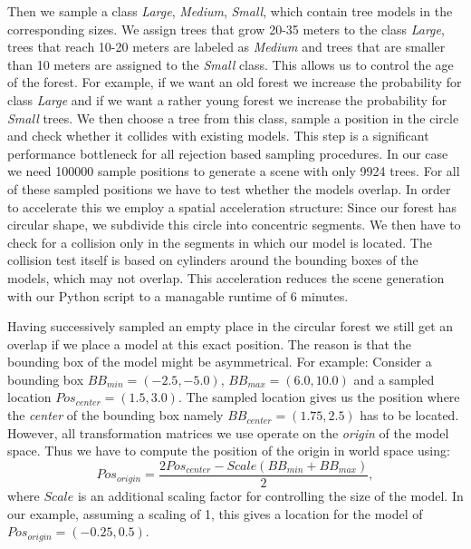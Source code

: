 Then we sample a class \textit{Large}, \textit{Medium}, \textit{Small}, which contain tree models in the corresponding sizes.
We assign trees that grow 20-35 meters to the class \textit{Large}, trees that reach 10-20 meters are labeled as \textit{Medium} and trees that are smaller than 10 meters are assigned to the \textit{Small} class.
This allows us to control the age of the forest.
For example, if we want an old forest we increase the probability for class \textit{Large} and if we want a rather young forest we increase the probability for \textit{Small} trees.
We then choose a tree from this class, sample a position in the circle and check whether it collides with existing models.
This step is a significant performance bottleneck for all rejection based sampling procedures.
In our case we need 100000 sample positions to generate a scene with only 9924 trees.
For all of these sampled positions we have to test whether the models overlap.
In order to accelerate this we employ a spatial acceleration structure: Since our forest has circular shape, we subdivide this circle into concentric segments.
We then have to check for a collision only in the segments in which our model is located.
The collision test itself is based on cylinders around the bounding boxes of the models, which may not overlap.
This acceleration reduces the scene generation with our Python script to a managable runtime of 6 minutes.

Having successively sampled an empty place in the circular forest we still get an overlap if we place a model at this exact position.
The reason is that the bounding box of the model might be asymmetrical.
For example: Consider a bounding box $BB_{min}=(-2.5, -5.0)$, $BB_{max}=(6.0, 10.0)$ and a sampled location $Pos_{center}=(1.5, 3.0)$.
The sampled location gives us the position where the \textit{center} of the bounding box namely $BB_{center}=(1.75, 2.5)$ has to be located.
However, all transformation matrices we use operate on the \textit{origin} of the model space.
Thus we have to compute the position of the origin in world space using:
\begin{equation*}
    Pos_{origin}=\frac{2Pos_{center}-Scale(BB_{min}+BB_{max})}{2},
\end{equation*}
where $Scale$ is an additional scaling factor for controlling the size of the model.
In our example, assuming a scaling of 1, this gives a location for the model of $Pos_{origin}=(-0.25, 0.5)$.

